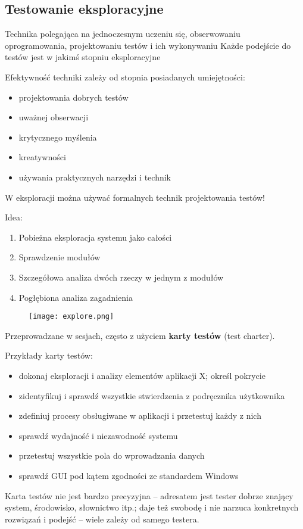 \documentclass[../main.tex]{subfiles}
\begin{document}
    \subsection{Testowanie eksploracyjne}
    Technika polegająca na jednoczesnym uczeniu się, obserwowaniu
    oprogramowania, projektowaniu testów i ich wykonywaniu
    Każde podejście do testów jest w jakimś stopniu eksploracyjne


    Efektywność techniki zależy od stopnia posiadanych umiejętności:
    \begin{itemize}
        \item projektowania dobrych testów
        \item uważnej obserwacji
        \item krytycznego myślenia
        \item kreatywności
        \item używania praktycznych narzędzi i technik
    \end{itemize}
    W eksploracji można używać formalnych technik projektowania testów!

    Idea:
    \begin{enumerate}
        \item Pobieżna eksploracja systemu jako całości
        \item Sprawdzenie modułów
        \item Szczegółowa analiza dwóch rzeczy w jednym z modułów
        \item Pogłębiona analiza zagadnienia
    \end{enumerate}

    \begin{figure}[H]
        \texttt{[image: explore.png]}
    \end{figure}

    Przeprowadzane w sesjach, często z użyciem \textbf{karty testów} (test charter).

    Przykłady karty testów:
    \begin{itemize}
        \item dokonaj eksploracji i analizy elementów aplikacji X; określ pokrycie
        \item zidentyfikuj i sprawdź wszystkie stwierdzenia z podręcznika użytkownika
        \item zdefiniuj procesy obsługiwane w aplikacji i przetestuj każdy z nich
        \item sprawdź wydajność i niezawodność systemu
        \item przetestuj wszystkie pola do wprowadzania danych
        \item sprawdź GUI pod kątem zgodności ze standardem Windows
    \end{itemize}
    Karta testów nie jest bardzo precyzyjna – adresatem jest tester dobrze znający system, środowisko,
    słownictwo itp.; daje też swobodę i nie narzuca konkretnych rozwiązań i podejść – wiele zależy od samego testera.
\end{document}

